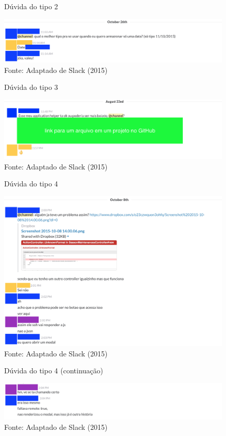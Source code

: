 \begin{figure}[h]
	\centering
    \caption{Dúvida do tipo 2}
    \includegraphics[width=15cm]{Imagens/c-type-2-1-1.png}
	\caption*{Fonte: Adaptado de Slack (2015)}
\end{figure}

\begin{figure}[h]
	\centering
    \caption{Dúvida do tipo 3}
    \includegraphics[width=15cm]{Imagens/c-type-3-1-1.png}
	\caption*{Fonte: Adaptado de Slack (2015)}
\end{figure}

\begin{figure}[h]
	\centering
    \caption{Dúvida do tipo 4}
    \includegraphics[width=15cm]{Imagens/c-type-4-1-1.png}
	\caption*{Fonte: Adaptado de Slack (2015)}
\end{figure}

\begin{figure}[h]
	\centering
    \caption{Dúvida do tipo 4 (continuação)}
    \includegraphics[width=15cm]{Imagens/c-type-4-1-2.png}
	\caption*{Fonte: Adaptado de Slack (2015)}
\end{figure}

